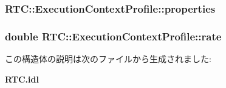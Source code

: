 \subsubsection[{properties}]{ {\bf RTC::ExecutionContextProfile::properties}}\label{structRTC_1_1ExecutionContextProfile_aeb613f6da4b2289ac3a3e89ef973f19b}
\subsubsection[{rate}]{\setlength{\rightskip}{0pt plus 5cm}double {\bf RTC::ExecutionContextProfile::rate}}\label{structRTC_1_1ExecutionContextProfile_af6009ee3292a68761c00ed02c93c5c8c}


この構造体の説明は次のファイルから生成されました:\begin{DoxyCompactItemize}
\item 
{\bf RTC.idl}\end{DoxyCompactItemize}
